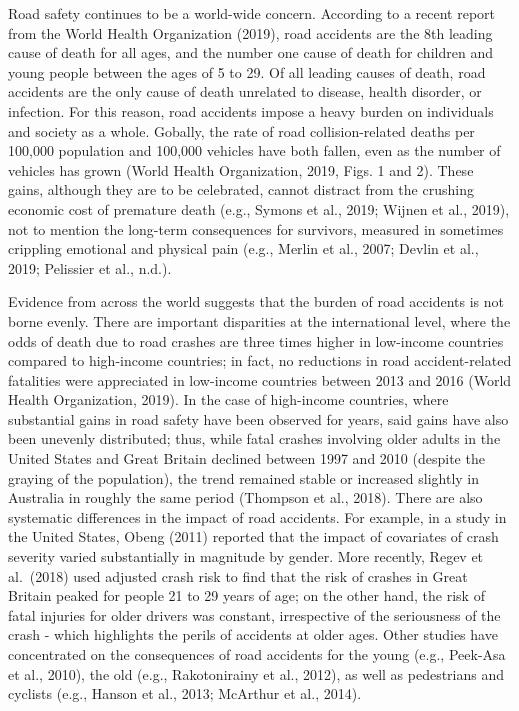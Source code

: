 \documentclass[]{elsarticle} %
\begin{document}
Road safety continues to be a world-wide concern. According to a recent
report from the World Health Organization (2019), road accidents are the
8th leading cause of death for all ages, and the number one cause of
death for children and young people between the ages of 5 to 29. Of all
leading causes of death, road accidents are the only cause of death
unrelated to disease, health disorder, or infection. For this reason,
road accidents impose a heavy burden on individuals and society as a
whole. Gobally, the rate of road collision-related deaths per 100,000
population and 100,000 vehicles have both fallen, even as the number of
vehicles has grown (World Health Organization, 2019, Figs. 1 and 2).
These gains, although they are to be celebrated, cannot distract from
the crushing economic cost of premature death (e.g., Symons et al.,
2019; Wijnen et al., 2019), not to mention the long-term consequences
for survivors, measured in sometimes crippling emotional and physical
pain (e.g., Merlin et al., 2007; Devlin et al., 2019; Pelissier et al.,
n.d.).

Evidence from across the world suggests that the burden of road
accidents is not borne evenly. There are important disparities at the
international level, where the odds of death due to road crashes are
three times higher in low-income countries compared to high-income
countries; in fact, no reductions in road accident-related fatalities
were appreciated in low-income countries between 2013 and 2016 (World
Health Organization, 2019). In the case of high-income countries, where
substantial gains in road safety have been observed for years, said
gains have also been unevenly distributed; thus, while fatal crashes
involving older adults in the United States and Great Britain declined
between 1997 and 2010 (despite the graying of the population), the trend
remained stable or increased slightly in Australia in roughly the same
period (Thompson et al., 2018). There are also systematic differences in
the impact of road accidents. For example, in a study in the United
States, Obeng (2011) reported that the impact of covariates of crash
severity varied substantially in magnitude by gender. More recently,
Regev et al.~(2018) used adjusted crash risk to find that the risk of
crashes in Great Britain peaked for people 21 to 29 years of age; on the
other hand, the risk of fatal injuries for older drivers was constant,
irrespective of the seriousness of the crash - which highlights the
perils of accidents at older ages. Other studies have concentrated on
the consequences of road accidents for the young (e.g., Peek-Asa et al.,
2010), the old (e.g., Rakotonirainy et al., 2012), as well as
pedestrians and cyclists (e.g., Hanson et al., 2013; McArthur et al.,
2014).
\end{document}
